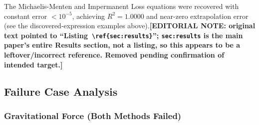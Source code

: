 \documentclass[twoside,11pt]{article}
\begin{document}
The Michaelis-Menten and Impermanent Loss equations were recovered with constant error $< 10^{-5}$, achieving $R^2 = 1.0000$ and near-zero extrapolation error (see the discovered-expression examples above).\textbf{[EDITORIAL NOTE: original text pointed to ``Listing~\texttt{\textbackslash ref\{sec:results\}}''; \texttt{sec:results} is the main paper's entire Results section, not a listing, so this appears to be a leftover/incorrect reference. Removed pending confirmation of intended target.]}

\subsection{Failure Case Analysis}

\subsubsection{Gravitational Force (Both Methods Failed)}
\end{document}
